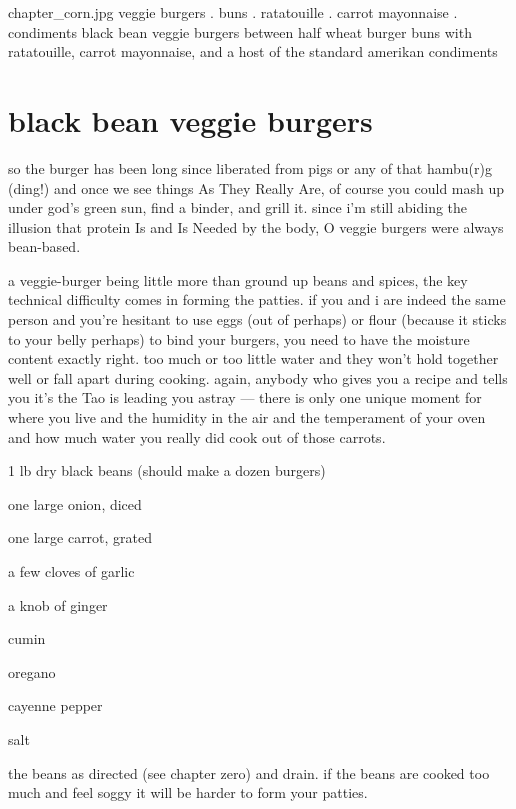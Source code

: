 \mychapter
{chapter_corn.jpg}
{veggie burgers . buns . ratatouille . carrot mayonnaise . condiments}
{black bean veggie burgers between half wheat burger buns with
ratatouille, carrot mayonnaise, and a host of the standard amerikan
condiments}

\section{black bean veggie burgers}

so the burger has been long since liberated from pigs or any of that hambu(r)g 
(ding!) and once we see things As They Really Are, of course you could mash up 
 under god's green sun, find a binder, and grill it. since i'm still 
abiding the illusion that protein Is and Is Needed by the body, O  
veggie burgers were always bean-based.

a veggie-burger being little more than ground up beans and spices, the key 
technical difficulty comes in forming the patties. if you and i are indeed the 
same person and you're hesitant to use eggs (out of  perhaps) or flour 
(because it sticks to your belly perhaps) to bind your burgers, you need to 
have the moisture content exactly right. too much or too little water and they 
won't hold together well or fall apart during cooking. again, anybody who 
gives you a recipe and tells you it's the Tao is leading you astray --- there 
is only one unique moment for where you live and the humidity in the air and 
the temperament of your oven and how much water you really did cook out of 
those carrots.

\begin{ingredients}
  \item 1 lb dry black beans (should make a dozen burgers)
  \item one large onion, diced
  \item one large carrot, grated
  \item a few cloves of garlic
  \item a knob of ginger
  \item cumin
  \item oregano
  \item cayenne pepper
  \item salt
\end{ingredients}

 the beans as directed (see chapter zero) and drain. if the beans are 
cooked too much and feel soggy it will be harder to form your patties.

